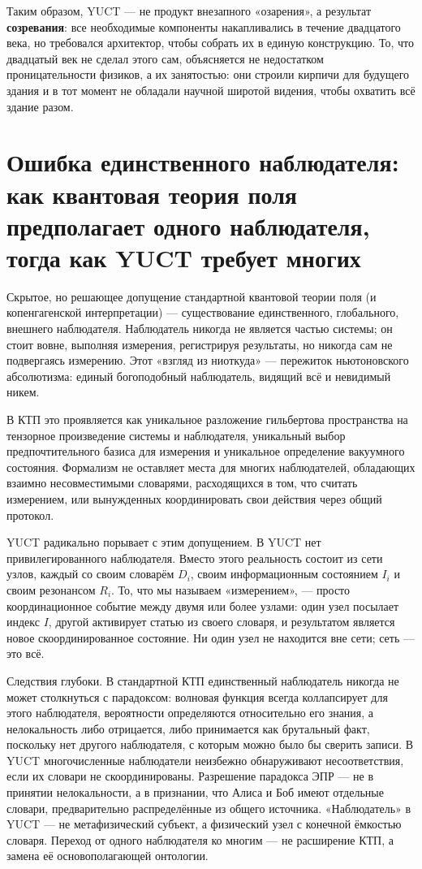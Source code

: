 \documentclass[12pt,a4paper]{article}
\begin{document}
	Таким образом, YUCT — не продукт внезапного «озарения», а результат \textbf{созревания}: все необходимые компоненты накапливались в течение двадцатого века, но требовался архитектор, чтобы собрать их в единую конструкцию. То, что двадцатый век не сделал этого сам, объясняется не недостатком проницательности физиков, а их занятостью: они строили кирпичи для будущего здания и в тот момент не обладали научной широтой видения, чтобы охватить всё здание разом.
	
	\section{Ошибка единственного наблюдателя: как квантовая теория поля предполагает одного наблюдателя, тогда как YUCT требует многих}
	
	Скрытое, но решающее допущение стандартной квантовой теории поля (и копенгагенской интерпретации) — существование единственного, глобального, внешнего наблюдателя. Наблюдатель никогда не является частью системы; он стоит вовне, выполняя измерения, регистрируя результаты, но никогда сам не подвергаясь измерению. Этот «взгляд из ниоткуда» — пережиток ньютоновского абсолютизма: единый богоподобный наблюдатель, видящий всё и невидимый никем.
	
	В КТП это проявляется как уникальное разложение гильбертова пространства на тензорное произведение системы и наблюдателя, уникальный выбор предпочтительного базиса для измерения и уникальное определение вакуумного состояния. Формализм не оставляет места для многих наблюдателей, обладающих взаимно несовместимыми словарями, расходящихся в том, что считать измерением, или вынужденных координировать свои действия через общий протокол.
	
	YUCT радикально порывает с этим допущением. В YUCT нет привилегированного наблюдателя. Вместо этого реальность состоит из сети узлов, каждый со своим словарём \(D_i\), своим информационным состоянием \(I_i\) и своим резонансом \(R_i\). То, что мы называем «измерением», — просто координационное событие между двумя или более узлами: один узел посылает индекс \(I\), другой активирует статью из своего словаря, и результатом является новое скоординированное состояние. Ни один узел не находится вне сети; сеть — это всё.
	
	Следствия глубоки. В стандартной КТП единственный наблюдатель никогда не может столкнуться с парадоксом: волновая функция всегда коллапсирует для этого наблюдателя, вероятности определяются относительно его знания, а нелокальность либо отрицается, либо принимается как брутальный факт, поскольку нет другого наблюдателя, с которым можно было бы сверить записи. В YUCT многочисленные наблюдатели неизбежно обнаруживают несоответствия, если их словари не скоординированы. Разрешение парадокса ЭПР — не в принятии нелокальности, а в признании, что Алиса и Боб имеют отдельные словари, предварительно распределённые из общего источника. «Наблюдатель» в YUCT — не метафизический субъект, а физический узел с конечной ёмкостью словаря. Переход от одного наблюдателя ко многим — не расширение КТП, а замена её основополагающей онтологии.
	
\end{document}
